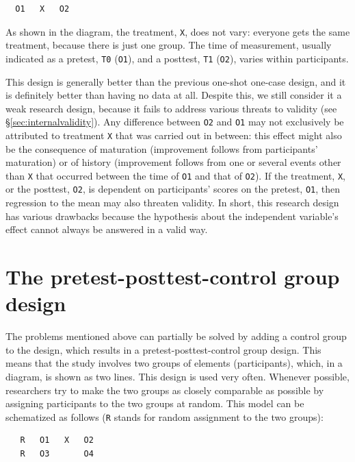 \documentclass[
]{book}
\begin{document}
\begin{verbatim}
  O1   X   O2
\end{verbatim}

As shown in the diagram, the treatment, \texttt{X}, does not vary: everyone gets the same treatment, because there is just one group. The time of measurement, usually indicated as a pretest, \texttt{T0} (\texttt{O1}), and a posttest, \texttt{T1} (\texttt{O2}), varies within participants.

This design is generally better than the previous one-shot one-case design, and it is definitely better than having no data at all. Despite this, we still consider it a weak research design, because it fails to address various threats to validity (see §\ref{sec:internalvalidity}). Any difference between \texttt{O2} and \texttt{O1} may not exclusively be attributed to treatment \texttt{X} that was carried out in between: this effect might also be the consequence of maturation (improvement follows from participants' maturation) or of history (improvement follows from one or several events other than \texttt{X} that occurred between the time of \texttt{O1} and that of \texttt{O2}). If the treatment, \texttt{X}, or the posttest, \texttt{O2}, is dependent on participants' scores on the pretest, \texttt{O1}, then regression to the mean may also threaten validity. In short, this research design has various drawbacks because the hypothesis about the independent variable's effect cannot always be answered in a valid way.

\hypertarget{sec:pretest-posttest-control-group-design}{%
\section{The pretest-posttest-control group design}\label{sec:pretest-posttest-control-group-design}}

The problems mentioned above can partially be solved by adding a control group to the design, which results in a pretest-posttest-control group design. This means that the study involves two groups of elements (participants), which, in a diagram, is shown as two lines. This design is used very often. Whenever possible, researchers try to make the two groups as closely comparable as possible by assigning participants to the two groups at random. This model can be schematized as follows (\texttt{R} stands for random assignment to the two groups):

\begin{verbatim}
   R   O1   X   O2
   R   O3       O4
\end{verbatim}
\end{document}
